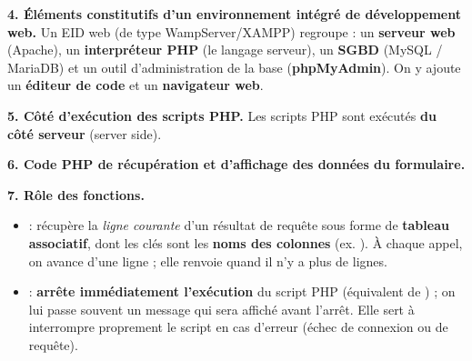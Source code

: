 \medskip
\textbf{4. Éléments constitutifs d'un environnement intégré de développement web.} Un EID web
(de type WampServer/XAMPP) regroupe : un \textbf{serveur web} (Apache), un
\textbf{interpréteur PHP} (le langage serveur), un \textbf{SGBD} (MySQL / MariaDB) et un
outil d'administration de la base (\textbf{phpMyAdmin}). On y ajoute un \textbf{éditeur de
code} et un \textbf{navigateur web}.

\medskip
\textbf{5. Côté d'exécution des scripts PHP.} Les scripts PHP sont exécutés \textbf{du côté
serveur} (server side).

\medskip
\textbf{6. Code PHP de récupération et d'affichage des données du formulaire.}


\medskip
\textbf{7. Rôle des fonctions.}
\begin{itemize}
  \item {} : récupère la \emph{ligne courante} d'un résultat de
  requête  sous forme de \textbf{tableau associatif}, dont les clés sont les
  \textbf{noms des colonnes} (ex. ). À chaque appel, on avance
  d'une ligne ; elle renvoie  quand il n'y a plus de lignes.
  \item {} : \textbf{arrête immédiatement l'exécution} du script PHP (équivalent de
  ) ; on lui passe souvent un message qui sera affiché avant l'arrêt. Elle sert
  à interrompre proprement le script en cas d'erreur (échec de connexion ou de requête).
\end{itemize}

